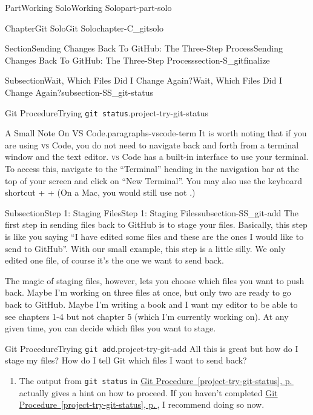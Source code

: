 \documentclass[twoside,10pt,]{book}
\newcommand{\xreffont}{\relax}
\newcommand{\mono}[1]{\texttt{#1}}
\newcommand{\initialism}[1]{\textsc{\MakeLowercase{#1}}}
\DeclareRobustCommand{\initialismintitle}[1]{\texorpdfstring{#1}{#1}}
\newcommand{\kbd}[1]{\keys{{#1}}}
\begin{document}
\begin{partptx}{Part}{Working Solo}{}{Working Solo}{}{}{part-part-solo}
\begin{chapterptx}{Chapter}{Git Solo}{}{Git Solo}{}{}{chapter-C_gitsolo}
\begin{sectionptx}{Section}{Sending Changes Back To GitHub: The Three-Step Process}{}{Sending Changes Back To GitHub: The Three-Step Process}{}{}{section-S_gitfinalize}
\begin{subsectionptx}{Subsection}{Wait, Which Files Did I Change Again?}{}{Wait, Which Files Did I Change Again?}{}{}{subsection-SS_git-status}
\begin{project}{Git Procedure}{Trying \mono{git status}.}{project-try-git-status}
\end{project}%
\begin{paragraphs}{A Small Note On \initialismintitle{VS} Code.}{paragraphs-vscode-term}%
It is worth noting that if you are using \initialism{VS} Code, you do not need to navigate back and forth from a terminal window and the text editor. \initialism{VS} Code has a built-in interface to use your terminal. To access this, navigate to the ``Terminal'' heading in the navigation bar at the top of your screen and click on ``New Terminal''. You may also use the keyboard shortcut \kbd{Ctrl} + \kbd{Shift} + \kbd{\textasciigrave{}} (On a Mac, you would still use \kbd{Ctrl} not \kbd{command}.)%
\end{paragraphs}%
\end{subsectionptx}
%
%
\typeout{************************************************}
\typeout{************************************************}
%
\begin{subsectionptx}{Subsection}{Step 1: Staging Files}{}{Step 1: Staging Files}{}{}{subsection-SS_git-add}
%
%
%
The first step in sending files back to GitHub is to stage your files. Basically, this step is like you saying ``I have edited some files and these are the ones I would like to send to GitHub''. With our small example, this step is a little silly. We only edited one file, of course it's the one we want to send back.%
\par
The magic of staging files, however, lets you choose which files you want to push back. Maybe I'm working on three files at once, but only two are ready to go back to GitHub. Maybe I'm writing a book and I want my editor to be able to see chapters 1-4 but not chapter 5 (which I'm currently working on). At any given time, you can decide which files you want to stage.%
\begin{project}{Git Procedure}{Trying \mono{git add}.}{project-try-git-add}%
All this is great but how do I stage my files? How do I tell Git which files I want to send back?%
\begin{enumerate}[font=\bfseries,label=(\alph*),ref=\alph*]%
\item{}The output from \mono{git status} in \hyperref[project-try-git-status]{Git Procedure~{\xreffont\ref{project-try-git-status}}, p.\,\pageref{project-try-git-status}} actually gives a hint on how to proceed. If you haven't completed \hyperref[project-try-git-status]{Git Procedure~{\xreffont\ref{project-try-git-status}}, p.\,\pageref{project-try-git-status}}, I recommend doing so now.%

\end{enumerate}
\end{project}
\end{subsectionptx}
\end{sectionptx}
\end{chapterptx}
\end{partptx}
\end{document}
